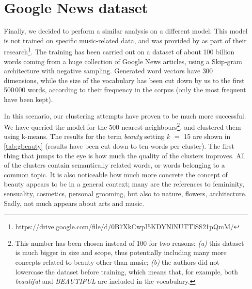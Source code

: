 \section{Google News dataset}
Finally, we decided to perform a similar analysis on a different model. This model is not trained on specific music-related data, and was provided by \citeauthor{mikolov2013distributed} as part of their research\footnote{\url{https://drive.google.com/file/d/0B7XkCwpI5KDYNlNUTTlSS21pQmM/}}. The training has been carried out on a dataset of about 100 billion words coming from a huge collection of Google News articles, using a Skip-gram architecture with negative sampling. Generated word vectors have 300 dimensions, while the size of the vocabulary has been cut down by us to the first 500\,000 words, according to their frequency in the corpus (only the most frequent have been kept).

In this scenario, our clustering attempts have proven to be much more successful. We have queried the model for the 500 nearest neighbours\footnote{This number has been chosen instead of 100 for two reasons: \emph{(a)} this dataset is much bigger in size and scope, thus potentially including many more concepts related to beauty other than music; \emph{(b)} the authors did not lowercase the dataset before training, which means that, for example, both \emph{beautiful} and \emph{BEAUTIFUL} are included in the vocabulary.}, and clustered them using k-means. The results for the term \emph{beauty} setting $k$ $=$ 15 are shown in \autoref{tab:gbeauty} (results have been cut down to ten words per cluster). The first thing that jumps to the eye is how much the quality of the clusters improves. All of the clusters contain semantically related words, or words belonging to a common topic. It is also noticeable how much more concrete the concept of beauty appears to be in a general context; many are the references to femininity, sensuality, cosmetics, personal grooming, but also to nature, flowers, architecture. Sadly, not much appears about arts and music.


